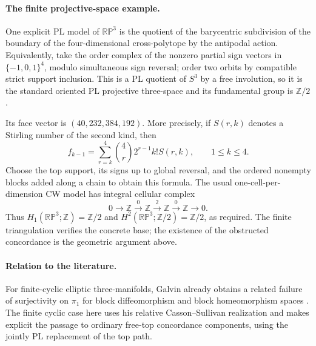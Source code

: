 \paragraph{The finite projective-space example.}
One explicit PL model of $\mathbb {RP}^{3}$ is the quotient
of the barycentric subdivision of the boundary of the
four-dimensional cross-polytope by the antipodal action.
Equivalently, take the order complex of the nonzero partial
sign vectors in $\{-1,0,1\}^4$, modulo simultaneous sign
reversal; order two orbits by compatible strict support
inclusion.  This is a PL quotient of $S^3$ by a free involution,
so it is the standard oriented PL projective three-space and
its fundamental group is $\mathbb Z/2$.

Its face vector is $(40,232,384,192)$.  More precisely, if
$S(r,k)$ denotes a Stirling number of the second kind, then
\[
 f_{k-1}=\sum_{r=k}^{4}\binom4r2^{r-1}k!S(r,k),
 \qquad 1\leq k\leq4.
\]
Choose the top support, its signs up to global reversal, and
the ordered nonempty blocks added along a chain to obtain
this formula.  The usual one-cell-per-dimension CW model has
integral cellular complex
\[
 0\longrightarrow\mathbb Z\xrightarrow{\,0\,}\mathbb Z
 \xrightarrow{\,2\,}\mathbb Z\xrightarrow{\,0\,}\mathbb Z
 \longrightarrow0.
\]
Thus $H_1(\mathbb {RP}^3;\mathbb Z)=\mathbb Z/2$ and
$H^2(\mathbb {RP}^3;\mathbb Z/2)=\mathbb Z/2$, as required.
The finite triangulation verifies the concrete base; the
existence of the obstructed concordance is the geometric
argument above.

\paragraph{Relation to the literature.}
For finite-cyclic elliptic three-manifolds, Galvin already
obtains a related failure of surjectivity on $\pi_1$ for
block diffeomorphism and block homeomorphism spaces
\cite[Theorem~9.0.1, Corollary~9.0.2, and Section~9.3,
pp.~109--117]{GalvinThesis2024}.
The finite cyclic case here uses his relative
Casson--Sullivan realization and makes explicit the passage
to ordinary free-top concordance components, using the
jointly PL replacement of the top path.
